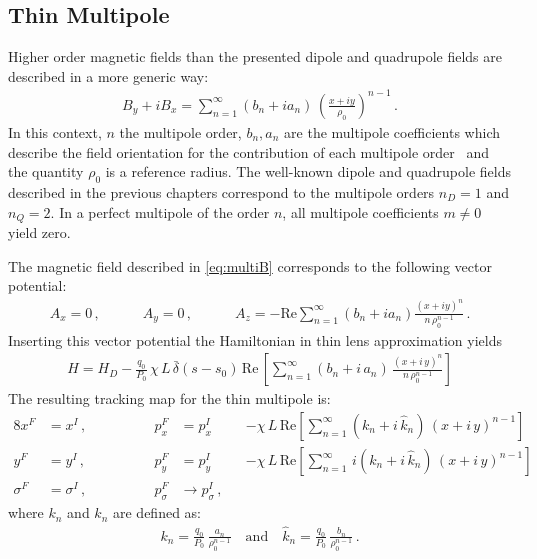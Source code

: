 \subsection{Thin Multipole}
Higher order magnetic fields than the presented dipole and quadrupole fields are described in a more generic way:
%
\begin{align}
  B_y + i B_x = \sum_{n=1}^{\infty} (b_n + i a_n) \, \left( \frac{x+iy}{\rho_0} \right)^{n-1} \, . \label{eq:multiB}
\end{align}
%
In this context, $n$ the multipole order, $b_n,a_n$ are the multipole coefficients which describe the field orientation for the contribution of each multipole order~\cite{wolski:lectures} and the quantity $\rho_0$ is a reference radius. The well-known dipole and quadrupole fields described in the previous chapters correspond to the multipole orders $n_D=1$ and $n_Q=2$. In a perfect multipole of the order $n$, all multipole coefficients $m\neq 0$ yield zero.

The magnetic field described in \eqref{eq:multiB} corresponds to the following vector potential:
%
\begin{align}
A_x = 0 \, , \quad \quad \quad A_y = 0 \, , \quad \quad \quad A_z = - \text{Re} \sum_{n=1}^{\infty} (b_n + i a_n) \frac{(x+i y)^n}{n \, \rho_0^{n-1}} \, .
\end{align} 
%
Inserting this vector potential the Hamiltonian in thin lens approximation yields
%
\begin{align}
  H = H_D - \frac{q_0}{P_0} \, \chi \, L \, \bar{\delta}(s-s_0) \, \text{Re} \, \left[ \sum_{n=1}^\infty (b_n + i \, a_n) \, \frac{(x+i \, y)^n}{n \, \rho_0^{n-1}}  \right] 
\end{align}
%
The resulting tracking map for the thin multipole is:
%
\begin{alignat}{8}
x^F & =  x^I \, ,  \quad \quad \quad \quad &p_x^F &=   p_x^I &&-  \chi \, L \, \text{Re} \left[ \sum_{n=1}^\infty (k_n+ i \, \hat{k}_n) \, (x+i\,y)^{n-1}    \right] \\ 
y^F & =  y^I \, ,  \quad \quad \quad \quad &p_y^F &=  p_y^I && -  \chi \, L \, \text{Re} \left[ \sum_{n=1}^\infty \, i (k_n+ i \, \hat{k}_n) \, (x+i\,y)^{n-1}    \right] \\ 
\sigma^F & =  \sigma^I \, ,  \quad \quad \quad \quad &p_\sigma^F &\rightarrow  p_\sigma^I \,, &&  &
\end{alignat}
%
where $k_n$ and $\hat{k}_n$ are defined as:
%
\begin{align}
  k_n = \frac{q_0}{P_0} \, \frac{a_n}{\rho_0^{n-1}} \quad \text{and} \quad   \hat{k}_n = \frac{q_0}{P_0} \, \frac{b_n}{\rho_0^{n-1}} \, .
\end{align}

